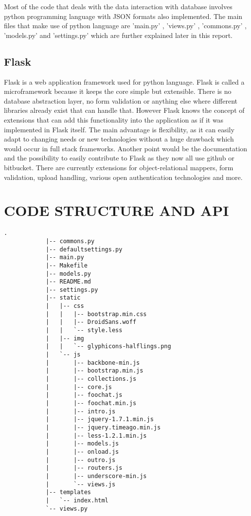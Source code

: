 \documentclass[a4paper,11pt,conference]{IEEEtran}
\begin{document}
		Most of the code that deals with the data interaction with database involves python programming language with JSON formats also implemented. The main files that make use of python language are 'main.py' , 'views.py' , 'commons.py' , 'models.py' and  'settings.py' which are further explained later in this report. 

		\subsection{Flask}
		Flask is a web application framework used for python language. Flask is called a microframework because it keeps the core simple but extensible. There is no database abstraction layer, no form validation or anything else where different libraries already exist that can handle that. However Flask knows the concept of extensions that can add this functionality into the  application as if it was implemented in Flask itself.
		The main advantage is flexibility, as it can easily adapt to changing needs or new technologies without a huge drawback which would occur in full stack frameworks. Another point would be the documentation and the possibility to easily contribute to Flask as they now all use github or bitbucket. There are currently extensions for object-relational mappers, form validation, upload handling, various open authentication technologies and more. 


	\section{CODE STRUCTURE AND API}
		\medskip
		\begin{lstlisting}[caption=Code structure]
			.
			|-- commons.py
			|-- defaultsettings.py
			|-- main.py
			|-- Makefile
			|-- models.py
			|-- README.md
			|-- settings.py
			|-- static
			|   |-- css
			|   |   |-- bootstrap.min.css
			|   |   |-- DroidSans.woff
			|   |   `-- style.less
			|   |-- img
			|   |   `-- glyphicons-halflings.png
			|   `-- js
			|       |-- backbone-min.js
			|       |-- bootstrap.min.js
			|       |-- collections.js
			|       |-- core.js
			|       |-- foochat.js
			|       |-- foochat.min.js
			|       |-- intro.js
			|       |-- jquery-1.7.1.min.js
			|       |-- jquery.timeago.min.js
			|       |-- less-1.2.1.min.js
			|       |-- models.js
			|       |-- onload.js
			|       |-- outro.js
			|       |-- routers.js
			|       |-- underscore-min.js
			|       `-- views.js
			|-- templates
			|   `-- index.html
			`-- views.py
		\end{lstlisting}
\end{document}
